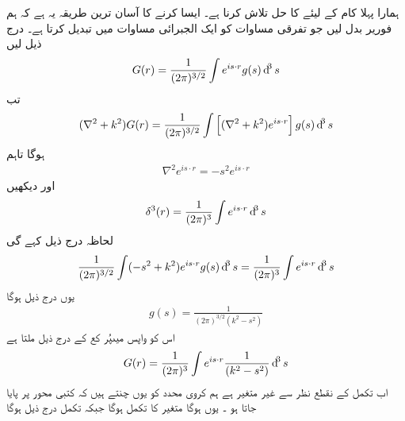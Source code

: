 ہمارا پہلا کام  کے لیئے  کا حل تلاش کرنا ہے۔ ایسا کرنے کا آسان ترین طریقہ یہ ہے کہ ہم فوریر بدل لیں جو تفرقی مساوات کو ایک الجبرائی مساوات میں تبدیل کرتا ہے۔ درج ذیل لیں
\begin{align}
	G(r)=\frac{1}{(2\pi)^{3/2}}\int e^{is\cdot r}g(s)\dif^3s
\end{align}
تب 
\begin{align*}
	(\nabla^2+k^2)G(r) = \frac{1}{(2\pi)^{3/2}}\int\left[(\nabla^2+k^2)e^{is\cdot r}\right]g(s)\dif^3s
\end{align*}
ہوگا تاہم
\begin{align}
	\nabla^2e^{is\cdot r} = -s^2 e^{is\cdot r}
\end{align}
اور  دیکھیں
\begin{align}
	\delta^3(r)=\frac{1}{(2\pi)^3}\int e^{is\cdot r}\dif^3s
\end{align}
لحاظہ  درج ذیل کہے گی
\begin{align*}
	\frac{1}{(2\pi)^{3/2}}\int(-s^2+k^2)e^{is\cdot r}g(s)\dif^3s = \frac{1}{(2\pi)^3}\int e^{is\cdot r}\dif^3s
\end{align*}
یوں درج ذیل ہوگا 
\begin{align}
	g(s) = \frac{1}{(2\pi)^{3/2}(k^2-s^2)}
\end{align}
اس کو واپس  میںپُر کع کے درج ذیل ملتا ہے
\begin{align}
	G(r) = \frac{1}{(2\pi)^3}\int e^{is\cdot r}\frac{1}{(k^2-s^2)}\dif^3s
\end{align}
اب  تکمل کے نقطع نظر سے  غیر متغیر ہے ہم کروی محدد  کو یوں چنتے ہیں کہ  کتبی محور پر پایا جاتا ہو ۔ یوں  ہوگا متغیر  کا تکمل  ہوگا جبکہ  تکمل درج ذیل ہوگا
 
